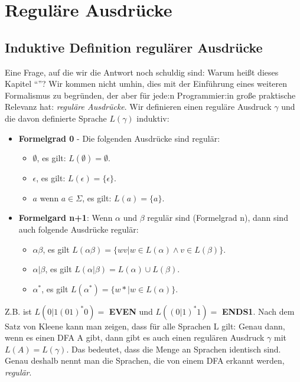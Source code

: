 \section{Reguläre Ausdrücke}

\subsection{Induktive Definition regulärer Ausdrücke}
Eine Frage, auf die wir die Antwort noch schuldig sind:
Warum heißt dieses Kapitel ``''?
Wir kommen nicht umhin, dies mit der Einführung eines weiteren Formalismus zu begründen,
der aber für jede:n Programmier:in große praktische Relevanz hat:
\emph{reguläre Ausdrücke}.
Wir definieren einen reguläre Ausdruck $\gamma$
und die davon definierte Sprache $L(\gamma)$ induktiv:
\begin{itemize}
    \item \textbf{Formelgrad 0} - Die folgenden Ausdrücke sind regulär:
        \begin{itemize}
            \item $\emptyset$, es gilt: $L(\emptyset) = \emptyset$.
            \item $\epsilon$,  es gilt: $L(\epsilon) = \{\epsilon\}$.
            \item $a$ wenn $a \in \Sigma$, es gilt: $L(a) = \{a\}$.
        \end{itemize}
    \item \textbf{Formelgard n+1}: Wenn $\alpha$  und $\beta$ regulär sind (Formelgrad n),
        dann sind auch folgende Ausdrücke regulär:
        \begin{itemize}
            \item $\alpha\beta$,
                es gilt $L(\alpha\beta) = \{wv| w \in L(\alpha) \wedge v \in L(\beta)\}$.
            \item $\alpha|\beta$,
                es gilt $L(\alpha|\beta) = L(\alpha) \cup L(\beta)$. 
            \item $\alpha^*$,
                es gilt $L(\alpha^*) = \{w* | w \in L(\alpha)\}$.
        \end{itemize}
\end{itemize}

Z.B. ist $L(0|1(01)^*0) =$ \textbf{EVEN} und $L((0|1)^*1) =$ \textbf{ENDS1}.
Nach dem Satz von Kleene kann man zeigen, dass für alle Sprachen L gilt:
Genau dann, wenn es einen DFA A gibt, dann gibt es auch einen regulären Ausdruck $\gamma$
mit $L(A) = L(\gamma)$.
Das bedeutet, dass die Menge an Sprachen identisch sind.
Genau deshalb nennt man die Sprachen, die von einem DFA erkannt werden, \emph{regulär}.

